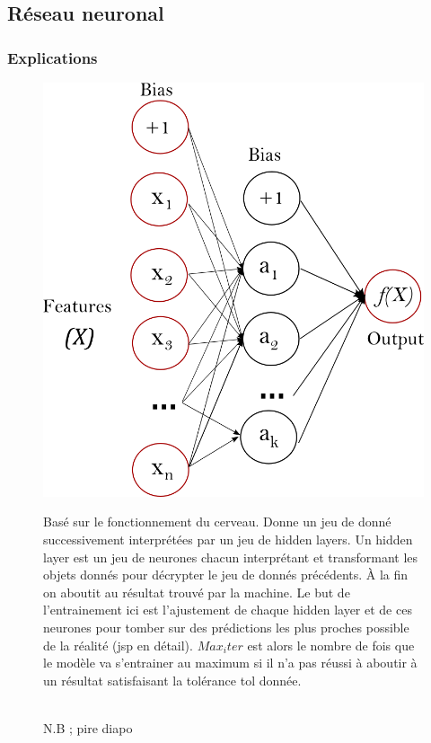 \documentclass{beamer}
\begin{document}
\subsection{Réseau neuronal}
\begin{frame}
	\frametitle{Explications}
	\begin{figure}[t]
		\centering
		\begin{minipage}{0.5\textwidth}
			\includegraphics[scale=0.15]{nn_sk}
		\end{minipage}
		\begin{minipage}{0.3\textwidth}
			\tiny{Basé sur le fonctionnement du cerveau. Donne un jeu de donné successivement interprétées par un jeu de hidden layers. Un hidden layer est un jeu de neurones chacun interprétant et transformant les objets donnés pour décrypter le jeu de donnés précédents. À la fin on aboutit au résultat trouvé par la machine. Le but de l'entrainement ici est l'ajustement de chaque hidden layer et de ces neurones pour tomber sur des prédictions les plus proches possible de la réalité (jsp en détail). $Max_iter$ est alors le nombre de fois que le modèle va s'entrainer au maximum si il n’a pas réussi à aboutir à un résultat satisfaisant la tolérance tol donnée.}
		\end{minipage}
	\\
	\alert{N.B ; pire diapo}
	\end{figure}
\end{frame}
\end{document}
